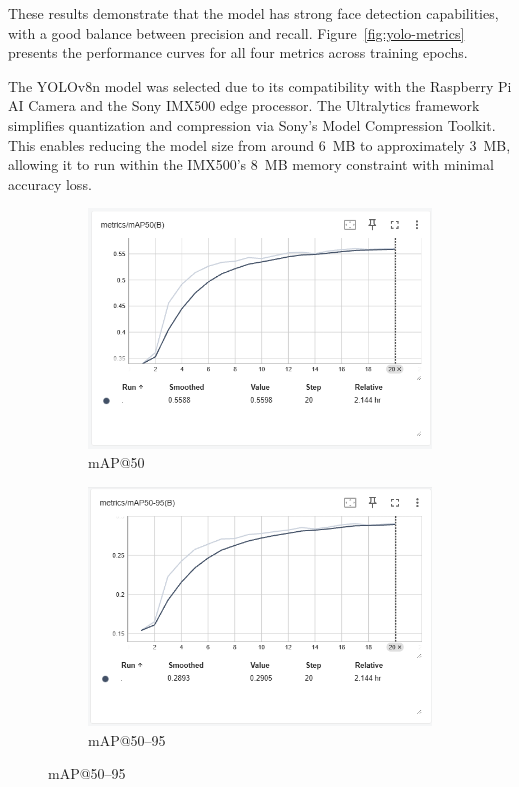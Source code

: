 These results demonstrate that the model has strong face detection capabilities, with a good balance between precision and recall. Figure~\ref{fig:yolo-metrics} presents the performance curves for all four metrics across training epochs.

The YOLOv8n model was selected due to its compatibility with the Raspberry Pi AI Camera and the Sony IMX500 edge processor. The Ultralytics framework simplifies quantization and compression via Sony’s Model Compression Toolkit. This enables reducing the model size from around 6~MB to approximately 3~MB, allowing it to run within the IMX500’s 8~MB memory constraint with minimal accuracy loss.

\begin{figure}[H]
	\centering
	\begin{subfigure}[b]{0.48\textwidth}
		\includegraphics[width=\textwidth]{figures/chapter4/map50.png}
		\caption{mAP@50}
	\end{subfigure}
	\hfill
	\begin{subfigure}[b]{0.48\textwidth}
		\includegraphics[width=\textwidth]{figures/chapter4/map5095.png}
		\caption{mAP@50--95}
	\end{subfigure}
	

\end{figure}
